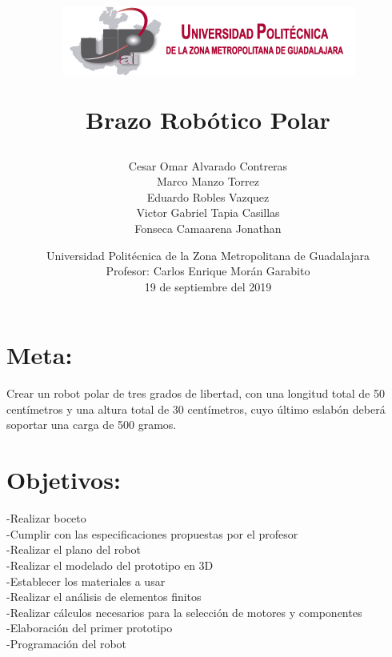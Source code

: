 \documentclass[12pt,a4paper]{report}
\begin{document}
\author{Cesar Omar Alvarado Contreras\\
Marco Manzo Torrez\\
Eduardo Robles Vazquez\\
Victor Gabriel Tapia Casillas\\
Fonseca Camaarena Jonathan}

\title{\begin{center}
\includegraphics[scale=1.5]{Escudo.png} 
\end{center}Brazo Robótico Polar}

\date{
Universidad Politécnica de la Zona Metropolitana de Guadalajara\\
Profesor: Carlos Enrique Morán Garabito\\
19 de septiembre del 2019}

\maketitle
\tableofcontents
\section{Meta:}
Crear un robot polar de tres grados de libertad, con una longitud total de 50 centímetros y una altura total de 30 centímetros, cuyo último eslabón deberá soportar una carga de 500 gramos.
\section{Objetivos:}
\noindent
-Realizar boceto\\
-Cumplir con las especificaciones propuestas por el profesor\\
-Realizar el plano del robot\\
-Realizar el modelado del prototipo en 3D\\
-Establecer los materiales a usar\\ 
-Realizar el análisis de elementos finitos\\
-Realizar cálculos necesarios para la selección de motores y componentes\\
-Elaboración del primer prototipo\\
-Programación del robot\\
\end{document}
